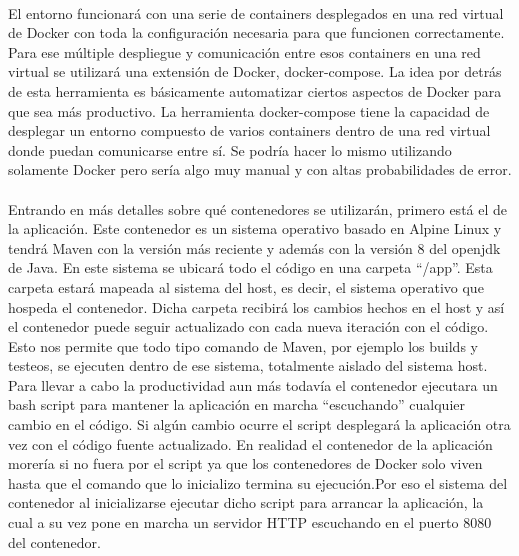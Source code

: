 \paragraph{}
El entorno funcionará con una serie de containers desplegados en una red virtual de Docker con toda la configuración necesaria para que funcionen correctamente. Para ese múltiple despliegue y comunicación entre esos containers en una red virtual se utilizará una extensión de Docker, docker-compose. La idea por detrás de esta herramienta es básicamente automatizar ciertos aspectos de Docker para que sea más productivo. La herramienta docker-compose tiene la capacidad de desplegar un entorno compuesto de varios containers dentro de una red virtual donde puedan comunicarse entre sí. Se podría hacer lo mismo utilizando solamente Docker pero sería algo muy manual y con altas probabilidades de error.

\paragraph{}
Entrando en más detalles sobre qué contenedores se utilizarán, primero está el de la aplicación. Este contenedor es un sistema operativo basado en Alpine Linux y tendrá Maven con la versión más reciente y además con la versión 8 del openjdk de Java. En este sistema se ubicará todo el código en una carpeta “/app”. Esta carpeta estará mapeada al sistema del host, es decir, el sistema operativo que hospeda el contenedor. Dicha carpeta recibirá los cambios hechos en el host y así el contenedor puede seguir actualizado con cada nueva iteración con el código. Esto nos permite que todo tipo comando de Maven, por ejemplo los builds y testeos,  se ejecuten dentro de ese sistema, totalmente aislado del sistema host.
Para llevar a cabo la productividad aun más todavía el contenedor ejecutara un bash script para mantener la aplicación en marcha “escuchando” cualquier cambio en el código. Si algún cambio ocurre el script desplegará la aplicación otra vez con el código fuente actualizado. En realidad el contenedor de la aplicación morería si no fuera por el script ya que los contenedores de Docker solo viven hasta que el comando que lo inicializo termina su ejecución.Por eso el sistema del contenedor al inicializarse ejecutar dicho script para arrancar la aplicación, la cual a su vez pone en marcha un servidor HTTP escuchando en el puerto 8080 del contenedor.

